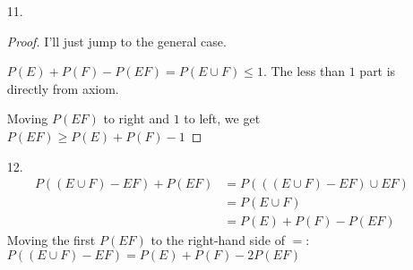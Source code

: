 \documentclass{article}
\begin{document}
\begin{itemize}
  Therefore, to prove the statement, we only need to show the
  equality:
  \begin{equation*}
     - P(EF) - P(EG) - P(FG) + P(EFG) =  - P(E^CFG) - P(EF^CG) -
     P(EFG^C) - 2P(EFG)
  \end{equation*}
  holds.

  \begin{equation*}
    \begin{split}
      &- P(EF) - P(EG) - P(FG) + P(EFG) + P(E^CFG) + P(EF^CG) +
      P(EFG^C) + 2P(EFG) \\
      &= (P(EFG) + P(E^CFG) - P(FG)) + (P(EFG) + P(EF^CG) - P(EG)) +
      (P(EFG) + P(EFG^C)-P(EF))\\
      &= (P(FG)-P(FG)) + (P(EG)-P(EG)) + (P(EF)-P(EF))\\
      &= 0
    \end{split}
  \end{equation*}
  Moving  terms on the right of $P(EFG)$ to right-hand-side of $=$
  completes the proof.
\item [11.]
  \begin{proof}
    I'll just jump to the general case.

    $P(E) + P(F) -P(EF) = P(E\cup F) \leq 1$. The less than $1$ part
    is directly from axiom.

    Moving $P(EF)$ to right and $1$ to left, we get
    $P(EF) \geq P(E)+P(F)-1$
  \end{proof}
\item [12.]
  \begin{equation*}
    \begin{split}
      P((E\cup F) - EF)  + P(EF)
      &= P(((E \cup F) - EF) \cup EF)\\
      &= P(E \cup F)\\
      &= P(E) + P(F) - P(EF)
    \end{split}
\end{equation*}
Moving the first $P(EF)$ to the right-hand side of $=$:
$P((E\cup F) - EF) = P(E) + P(F) - 2P(EF)$

\end{itemize}
\end{document}
